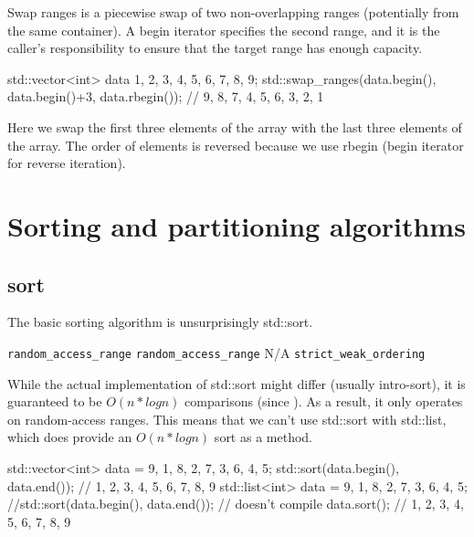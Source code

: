 Swap ranges is a piecewise swap of two non-overlapping ranges (potentially from the same container). A begin iterator specifies the second range, and it is the caller’s responsibility to ensure that the target range has enough capacity.


\begin{box-note}
\begin{cppcode}
std::vector<int> data{ 1, 2, 3, 4, 5, 6, 7, 8, 9};
std::swap_ranges(data.begin(), data.begin()+3, data.rbegin());
// 9, 8, 7, 4, 5, 6, 3, 2, 1
\end{cppcode}
\end{box-note}

Here we swap the first three elements of the array with the last three elements of the array. The order of elements is reversed because we use rbegin (begin iterator for reverse iteration).

\section{Sorting and partitioning algorithms}

\subsection{sort}

The basic sorting algorithm is unsurprisingly std::sort.


\constraints
    {\texttt{random\_access\_range}}
    {\texttt{random\_access\_range}}
    {N/A}
    {\texttt{strict\_weak\_ordering}}
    
While the actual implementation of std::sort might differ (usually intro-sort), it is guaranteed to be $O(n*logn)$ comparisons (since ). As a result, it only operates on random-access ranges. This means that we can’t use std::sort with std::list, which does provide an $O(n*logn)$ sort as a method.

\begin{box-note}
\begin{cppcode}
{
    std::vector<int> data = {9, 1, 8, 2, 7, 3, 6, 4, 5};
    std::sort(data.begin(), data.end());
    // 1, 2, 3, 4, 5, 6, 7, 8, 9
}
{
    std::list<int> data = {9, 1, 8, 2, 7, 3, 6, 4, 5};
    //std::sort(data.begin(), data.end()); // doesn't compile
    data.sort();
    // 1, 2, 3, 4, 5, 6, 7, 8, 9
}
\end{cppcode}
\end{box-note}

